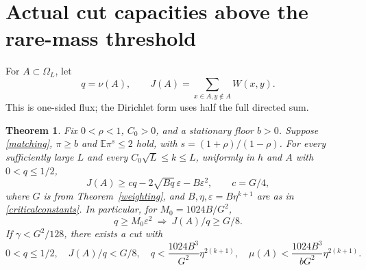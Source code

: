 \documentclass[11pt]{article}
\newtheorem{theorem}{Theorem}
\newcommand{\E}{\mathbb E}
\begin{document}
\section{Actual cut capacities above the rare-mass threshold}
For $A\subset\Omega_L$, let
\[
 q=\nu(A),\qquad
 J(A)=\sum_{x\in A,y\notin A}W(x,y).
\]
This is one-sided flux; the Dirichlet form uses half the full directed sum.
\begin{theorem}\label{capacity}
Fix $0<\rho<1$, $C_0>0$, and a stationary floor $b>0$. Suppose \eqref{matching}, $\pi\geq b$ and $\E\pi^s\leq2$ hold, with $s=(1+\rho)/(1-\rho)$. For every sufficiently large $L$ and every $C_0\sqrt L\leq k\leq L$, uniformly in $h$ and $A$ with $0<q\leq1/2$,
\begin{equation}\label{flux}
 J(A)\geq c q-2\sqrt{Bq}\,\varepsilon-B\varepsilon^2,
 \qquad c=G/4,
\end{equation}
where $G$ is from Theorem~\ref{weighting}, and $B,\eta,\varepsilon=B\eta^{k+1}$ are as in \eqref{criticalconstants}. In particular, for $M_0=1024B/G^2$,
\[
 q\geq M_0\varepsilon^2\ \Longrightarrow\ J(A)/q\geq G/8.
\]
If $\gamma<G^2/128$, there exists a cut with
\[
 0<q\leq1/2,\quad J(A)/q<G/8,\quad
 q<\frac{1024B^3}{G^2}\eta^{2(k+1)},\quad
 \mu(A)<\frac{1024B^3}{bG^2}\eta^{2(k+1)}.
\]
\end{theorem}
\end{document}
